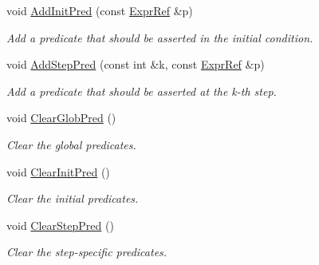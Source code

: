 \begin{DoxyCompactItemize}
\mbox{\label{classilang_1_1_ila_z3_unroller_ae70041d0a1d2f2732590b735019a4796}} 
void \mbox{\hyperlink{classilang_1_1_ila_z3_unroller_ae70041d0a1d2f2732590b735019a4796}{Add\+Init\+Pred}} (const \mbox{\hyperlink{classilang_1_1_expr_ref}{Expr\+Ref}} \&p)
\begin{DoxyCompactList}\small\item\em Add a predicate that should be asserted in the initial condition. \end{DoxyCompactList}\item 
\mbox{\label{classilang_1_1_ila_z3_unroller_aa639e90fdd342aac0caaf49b7b05d9de}} 
void \mbox{\hyperlink{classilang_1_1_ila_z3_unroller_aa639e90fdd342aac0caaf49b7b05d9de}{Add\+Step\+Pred}} (const int \&k, const \mbox{\hyperlink{classilang_1_1_expr_ref}{Expr\+Ref}} \&p)
\begin{DoxyCompactList}\small\item\em Add a predicate that should be asserted at the k-\/th step. \end{DoxyCompactList}\item 
\mbox{\label{classilang_1_1_ila_z3_unroller_a64e436c1d791b1872d16b50337700fc7}} 
void \mbox{\hyperlink{classilang_1_1_ila_z3_unroller_a64e436c1d791b1872d16b50337700fc7}{Clear\+Glob\+Pred}} ()
\begin{DoxyCompactList}\small\item\em Clear the global predicates. \end{DoxyCompactList}\item 
\mbox{\label{classilang_1_1_ila_z3_unroller_a92e26f951b88c01401f7c6175e50100a}} 
void \mbox{\hyperlink{classilang_1_1_ila_z3_unroller_a92e26f951b88c01401f7c6175e50100a}{Clear\+Init\+Pred}} ()
\begin{DoxyCompactList}\small\item\em Clear the initial predicates. \end{DoxyCompactList}\item 
\mbox{\label{classilang_1_1_ila_z3_unroller_a43412288799aeaee013373c5040401bb}} 
void \mbox{\hyperlink{classilang_1_1_ila_z3_unroller_a43412288799aeaee013373c5040401bb}{Clear\+Step\+Pred}} ()
\begin{DoxyCompactList}\small\item\em Clear the step-\/specific predicates. \end{DoxyCompactList}\item 

\end{DoxyCompactItemize}
